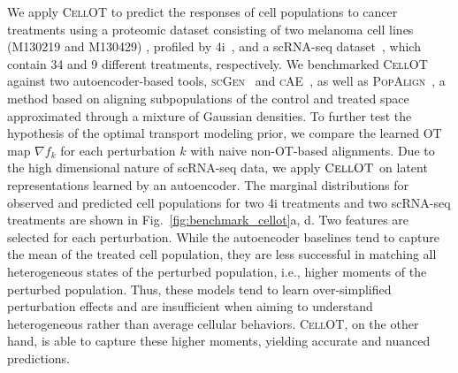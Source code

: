  We apply \textsc{CellOT} to predict the responses of cell populations to cancer treatments using a proteomic dataset consisting of two melanoma cell lines (M130219 and M130429) \citep{raaijmakers2015new}, profiled by 4i~\citep{gut2018multiplexed}, and a scRNA-seq dataset~\citep{srivatsan2020massively}, which contain 34 and 9 different treatments, respectively.
We benchmarked \textsc{CellOT} against two autoencoder-based tools, \textsc{scGen}~\citep{lotfollahi2019scgen} and \textsc{cAE}~\citep{lopez2018scvi}, as well as \textsc{PopAlign}~\citep{chen2020dissecting}, a method based on aligning subpopulations of the control and treated space approximated through a mixture of Gaussian densities.
To further test the hypothesis of the optimal transport modeling prior, we compare the learned OT map $\nabla f_k$ for each perturbation $k$ with naive non-OT-based alignments.
Due to the high dimensional nature of scRNA-seq data, we apply $\textsc{CellOT}$ on latent representations learned by an autoencoder.
The marginal distributions for observed and predicted cell populations for two 4i treatments and two scRNA-seq treatments are shown in Fig.~\ref{fig:benchmark_cellot}a, d. 
Two features are selected for each perturbation.
While the autoencoder baselines tend to capture the mean of the treated cell population, they are less successful in matching all heterogeneous states of the perturbed population, i.e., higher moments of the perturbed population.
Thus, these models tend to learn over-simplified perturbation effects and are insufficient when aiming to understand heterogeneous rather than average cellular behaviors.
\textsc{CellOT}, on the other hand, is able to capture these higher moments, yielding accurate and nuanced predictions.


